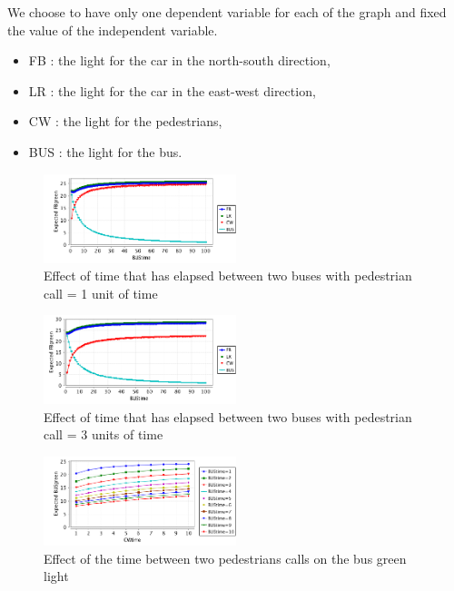 We choose to have only one dependent variable for each of the graph and fixed the value of the independent variable.
\begin{itemize}
	\item FB : the light for the car in the north-south direction,
	\item LR : the light for the car in the east-west direction,
	\item CW : the light for the pedestrians,
	\item BUS : the light for the bus.
\end{itemize}


\begin{figure}[H]\label{fig:cwfirst}
  \centering
    \includegraphics[width=0.5\textwidth]{picture/CWtime1.png}
    \caption{Effect of time that has elapsed between two buses with pedestrian call = 1 unit of time}
\end{figure}

\begin{figure}[H]\label{fig:cwthree}
  \centering
    \includegraphics[width=0.5\textwidth]{picture/CWtime3.png}
    \caption{Effect of time that has elapsed between two buses with pedestrian call = 3 units of time}
\end{figure}

\begin{figure}[H]\label{fig:busbus}
  \centering
    \includegraphics[width=0.5\textwidth]{picture/CWtimeOnBUS.png}
    \caption{Effect of the time between two pedestrians calls on the bus green light}
\end{figure}

